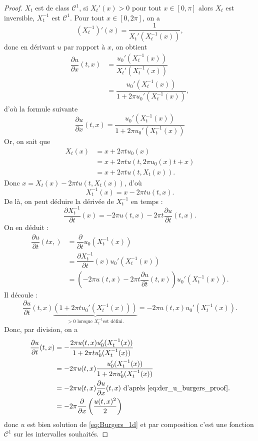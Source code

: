\begin{proof}
$X_t$ est de class $\mathcal{C}^1$, si $X_t'(x)>0$ pour tout $x \in [0, \pi]$ alors $X_t$ est inversible, $X_t^{-1}$ est $\mathcal{C}^1$. Pour tout $x \in [0,2 \pi]$, on a
\begin{equation}
(X_t^{-1})'(x) = \dfrac{1}{X_t'(X_t^{-1}(x))},
\end{equation}
donc en dérivant $u$ par rapport à $x$, on obtient
\begin{align*}
\dfrac{\partial u}{\partial x}(t,x) & = \dfrac{u_0'(X_t^{-1}(x))}{X_t'(X_t^{-1}(x))} \\
	& = \dfrac{u_0'(X_t^{-1}(x))}{1 + 2 \pi u_0'(X_t^{-1}(x))},
\end{align*}
d'où la formule suivante 
\begin{equation}
\dfrac{\partial u}{\partial x}(t,x)=\dfrac{u_0'(X_t^{-1}(x))}{1 + 2 \pi u_0'(X_t^{-1}(x))}
\label{eq:der_u_burgers_proof}
\end{equation}
Or, on sait que 
\begin{align*}
X_t(x) & = x + 2 \pi t u_0(x) \\
	& = x + 2 \pi t u(t,2 \pi u_0(x) t + x)\\
	& = x + 2 \pi t u(t,X_t(x)).
\end{align*}
Donc $x = X_t(x) - 2 \pi t u(t,X_t(x))$, d'où
\begin{equation}
X_t^{-1}(x) = x - 2 \pi t u(t,x).
\end{equation}
De là, on peut déduire la dérivée de $X_t^{-1}$ en temps :
\begin{equation}
\dfrac{\partial X_t^{-1}}{\partial t}(x) = - 2 \pi u(t,x) - 2 \pi t \dfrac{\partial u}{\partial t}(t,x).
\end{equation}
On en déduit :
\begin{align*}
\dfrac{\partial u}{\partial t}(tx,) & = \dfrac{\partial}{\partial t} u_0(X_t^{-1}(x)) \\
	& = \dfrac{\partial X_t^{-1}}{\partial t}(x) u_0'(X_t^{-1}(x)) \\
	& = (- 2 \pi u(t,x) - 2 \pi t \dfrac{\partial u}{\partial t}(t,x)) u_0'(X_t^{-1}(x)).
\end{align*}
Il découle :
\begin{equation}
\dfrac{\partial u}{\partial t}(t,x) \underbrace{(1 + 2 \pi t u_0'(X_t^{-1}(x)))}_{>0 \text{ lorsque } X_t^{-1} \text{est défini.}} = - 2 \pi u(t,x) u_0'(X_t^{-1}(x)).
\end{equation}
Donc, par division, on a
\begin{align*}
\dfrac{\partial u}{\partial t}(t,x) & = - \dfrac{2 \pi u(t,x) u_0'(X_t^{-1}(x))}{1 + 2 \pi t u_0'(X_t^{-1}(x))} \\
	& = - 2 \pi u(t,x) \dfrac{u_0'(X_t^{-1}(x))}{1 + 2 \pi u_0'(X_t^{-1}(x))} \\
	& = - 2 \pi u(t,x) \dfrac{\partial u}{\partial x}(t,x) \text{ d'après \eqref{eq:der_u_burgers_proof}.} \\
	& = - 2 \pi \dfrac{\partial}{\partial x}\left( \dfrac{u(t,x)^2}{2} \right)
\end{align*}
donc $u$ est bien solution de \eqref{eq:Burgers_1d} et par composition c'est une fonction $\mathcal{C}^1$ sur les intervalles souhaités.
\end{proof}

